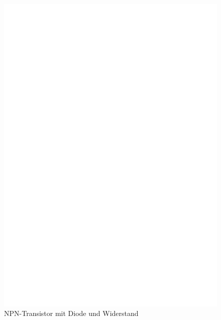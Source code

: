 \begin{figure}[H]
\centering
\includegraphics[]{../FIG/BJT_BU508D.eps}
\caption{NPN-Transistor mit Diode und Widerstand}
\label{fig:BJT-NPN-Di-R}
\end{figure}

